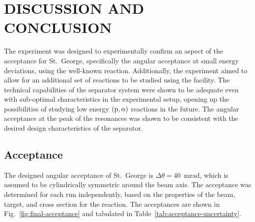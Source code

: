 \chapter{DISCUSSION AND CONCLUSION}
\label{ch:discussion-and-conclusion}

The experiment was designed to experimentally confirm an aspect of the
acceptance for St.\ George, specifically the angular acceptance at small
energy deviations, using the well-known \alpa{} reaction. Additionally,
the experiment aimed to allow for an additional set of reactions to be
studied using the facility. The technical capabilities of the separator
system were shown to be adequate even with sub-optimal characteristics
in the experimental setup, opening up the possibilities of studying low
energy $({\rm p},\alpha)$ reactions in the future. The angular
acceptance at the peak of the resonances was shown to be consistent with
the desired design characteristics of the separator.


\section{Acceptance}

The designed angular acceptance of St.\ George is
$\Delta\theta = 40$~mrad, which is assumed to be cylindrically symmetric
around the beam axis. The acceptance was determined for each run
independently, based on the properties of the beam, target, and cross
section for the \alpa{} reaction. The acceptances are shown in
Fig.~\ref{fig:final-acceptance} and tabulated in
Table~\ref{tab:acceptance-uncertainty}.

